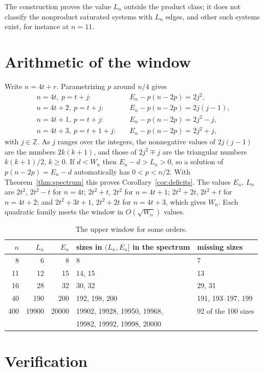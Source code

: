 \documentclass[11pt]{article}
\theoremstyle{remark}
\begin{document}
The construction proves the value $L_n$ outside the product class; it does
not classify the nonproduct saturated systems with $L_n$ edges, and other
such systems exist, for instance at $n=11$.

\section{Arithmetic of the window}

Write $n=4t+r$. Parametrizing $p$ around $n/4$ gives
\begin{align*}
n=4t,\ p=t+j:&\quad E_n-p(n-2p)=2j^2,\\
n=4t+2,\ p=t+j:&\quad E_n-p(n-2p)=2j(j-1),\\
n=4t+1,\ p=t+j:&\quad E_n-p(n-2p)=2j^2-j,\\
n=4t+3,\ p=t+1+j:&\quad E_n-p(n-2p)=2j^2+j,
\end{align*}
with $j\in\mathbb Z$. As $j$ ranges over the integers, the nonnegative values
of $2j(j-1)$ are the numbers $2k(k+1)$, and those of $2j^2\mp j$ are the
triangular numbers $k(k+1)/2$, $k\ge0$. If $d<W_n$ then $E_n-d>L_n>0$, so a
solution of $p(n-2p)=E_n-d$ automatically has $0<p<n/2$. With
Theorem~\ref{thm:spectrum} this proves Corollary~\ref{cor:deficits}. The
values $E_n$, $L_n$ are $2t^2$, $2t^2-t$ for $n=4t$; $2t^2+t$, $2t^2$ for
$n=4t+1$; $2t^2+2t$, $2t^2+t$ for $n=4t+2$; and $2t^2+3t+1$, $2t^2+2t$ for
$n=4t+3$, which gives $W_n$. Each quadratic family meets the window in
$O(\sqrt{W_n})$ values.

\begin{table}[ht]
\centering
\begin{tabular}{rrrll}
\toprule
$n$ & $L_n$ & $E_n$ & sizes in $(L_n,E_n]$ in the spectrum & missing sizes\\
\midrule
8 & 6 & 8 & 8 & 7\\
11 & 12 & 15 & 14, 15 & 13\\
16 & 28 & 32 & 30, 32 & 29, 31\\
40 & 190 & 200 & 192, 198, 200 & 191, 193--197, 199\\
400 & 19900 & 20000 & 19902, 19928, 19950, 19968, & 92 of the 100 sizes\\
 & & & 19982, 19992, 19998, 20000 & \\
\bottomrule
\end{tabular}
\caption{The upper window for some orders.}\label{tab:examples}
\end{table}

\section{Verification}\label{sec:verification}
\end{document}
